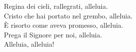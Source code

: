 
Regina dei cieli, rallegrati, alleluia.\\
Cristo che hai portato nel grembo, alleluia.\\
È risorto come aveva promesso, alleluia.\\
Prega il Signore per noi, alleluia.\\
Alleluia, alleluia!